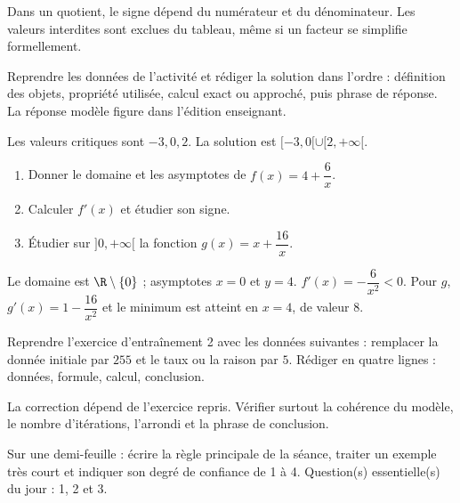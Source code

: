 \begin{summary}Dans un quotient, le signe dépend du numérateur et du dénominateur. Les valeurs interdites sont exclues du tableau, même si un facteur se simplifie formellement.\end{summary}

\begin{example}
Reprendre les données de l'activité et rédiger la solution dans l'ordre : définition des objets, propriété utilisée, calcul exact ou approché, puis phrase de réponse. La réponse modèle figure dans l'édition enseignant.
\end{example}
\begin{solution}Les valeurs critiques sont $-3,0,2$. La solution est $[-3,0[\cup[2,+\infty[$.\end{solution}

\begin{exercise}[essentiel]
\begin{enumerate}\item Donner le domaine et les asymptotes de $f(x)=4+\dfrac{6}x$.\item Calculer $f'(x)$ et étudier son signe.\item Étudier sur $]0,+\infty[$ la fonction $g(x)=x+\dfrac{16}x$.\end{enumerate}
\end{exercise}
\begin{solution}Le domaine est $\R\setminus\{0\}$ ; asymptotes $x=0$ et $y=4$. $f'(x)=-\dfrac{6}{x^2}<0$. Pour $g$, $g'(x)=1-\dfrac{16}{x^2}$ et le minimum est atteint en $x=4$, de valeur $8$.\end{solution}


\begin{homework}Reprendre l'exercice d'entraînement 2 avec les données suivantes : remplacer la donnée initiale par $255$ et le taux ou la raison par $5$. Rédiger en quatre lignes : données, formule, calcul, conclusion.\end{homework}
\begin{solution}La correction dépend de l'exercice repris. Vérifier surtout la cohérence du modèle, le nombre d'itérations, l'arrondi et la phrase de conclusion.\end{solution}

\begin{exitticket}[3 minutes]Sur une demi-feuille : écrire la règle principale de la séance, traiter un exemple très court et indiquer son degré de confiance de 1 à 4. Question(s) essentielle(s) du jour : 1, 2 et 3.\end{exitticket}

